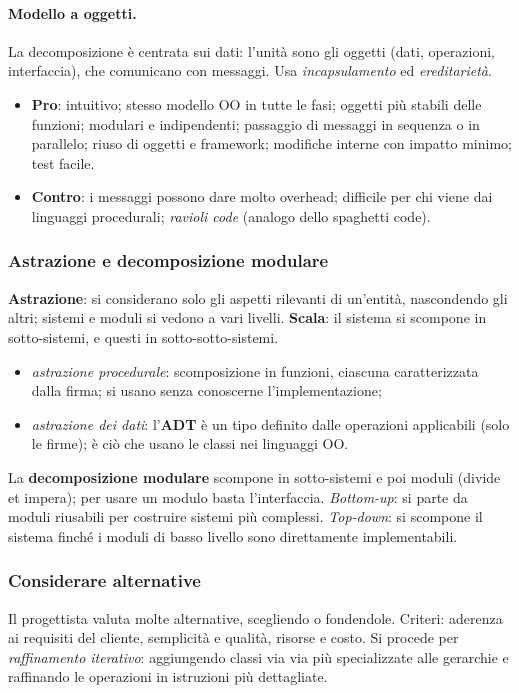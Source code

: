 \documentclass[a4paper,12pt]{article}
\begin{document}
\paragraph{Modello a oggetti.} La decomposizione è centrata sui dati: l'unità sono gli
oggetti (dati, operazioni, interfaccia), che comunicano con messaggi. Usa
\emph{incapsulamento} ed \emph{ereditarietà}.
\begin{itemize}
  \item \textbf{Pro}: intuitivo; stesso modello OO in tutte le fasi; oggetti più stabili
        delle funzioni; modulari e indipendenti; passaggio di messaggi in sequenza o in
        parallelo; riuso di oggetti e framework; modifiche interne con impatto minimo;
        test facile.
  \item \textbf{Contro}: i messaggi possono dare molto overhead; difficile per chi viene
        dai linguaggi procedurali; \emph{ravioli code} (analogo dello spaghetti code).
\end{itemize}

\subsubsection{Astrazione e decomposizione modulare}
\textbf{Astrazione}: si considerano solo gli aspetti rilevanti di un'entità, nascondendo
gli altri; sistemi e moduli si vedono a vari livelli. \textbf{Scala}: il sistema si
scompone in sotto-sistemi, e questi in sotto-sotto-sistemi.
\begin{itemize}
  \item \emph{astrazione procedurale}: scomposizione in funzioni, ciascuna caratterizzata
        dalla firma; si usano senza conoscerne l'implementazione;
  \item \emph{astrazione dei dati}: l'\textbf{ADT} è un tipo definito dalle operazioni
        applicabili (solo le firme); è ciò che usano le classi nei linguaggi OO.
\end{itemize}
La \textbf{decomposizione modulare} scompone in sotto-sistemi e poi moduli (divide et
impera); per usare un modulo basta l'interfaccia. \emph{Bottom-up}: si parte da moduli
riusabili per costruire sistemi più complessi. \emph{Top-down}: si scompone il sistema
finché i moduli di basso livello sono direttamente implementabili.

\subsubsection{Considerare alternative}
Il progettista valuta molte alternative, scegliendo o fondendole. Criteri: aderenza ai
requisiti del cliente, semplicità e qualità, risorse e costo. Si procede per
\emph{raffinamento iterativo}: aggiungendo classi via via più specializzate alle gerarchie
e raffinando le operazioni in istruzioni più dettagliate.

\newpage
\end{document}
